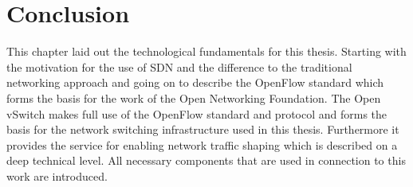 %
%


\section{Conclusion}

This chapter laid out the technological fundamentals for this thesis. Starting with the motivation for the use of SDN and the difference to the traditional networking approach and going on to describe the OpenFlow standard which forms the basis for the work of the Open Networking Foundation. The Open vSwitch makes full use of the OpenFlow standard and protocol and forms the basis for the network switching infrastructure used in this thesis. Furthermore it provides the service for enabling network traffic shaping which is described on a deep technical level. All necessary components that are used in connection to this work are introduced.